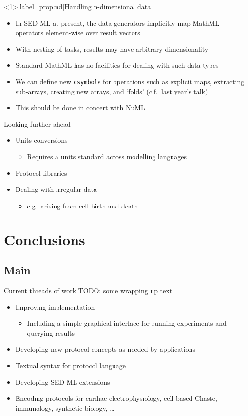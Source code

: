 \documentclass[t,xcolor={usenames,dvipsnames}]{beamer}
\newcommand{\subitem}[1]{\begin{itemize}[<.->]\item #1 \end{itemize}}
\begin{document}
\begin{frame}<1>[label=prop:nd]{Handling n-dimensional data}
\begin{itemize}
\item
  In SED-ML at present, the data generators implicitly map MathML
  operators element-wise over result vectors
\item
  With nesting of tasks, results may have arbitrary dimensionality
\item
  Standard MathML has no facilities for dealing with such data types
\item
  We can define new \texttt{csymbol}s for operations such as explicit
  maps, extracting sub-arrays, creating new arrays, and `folds'
  (c.f.\ last year's talk)
\item
  This should be done in concert with NuML
\end{itemize}
\end{frame}


\begin{frame}{Looking further ahead}
\begin{itemize}[<+->]
\item Units conversions
  \subitem{Requires a units standard across modelling languages}
\item Protocol libraries
\item Dealing with irregular data
  \subitem{e.g.\ arising from cell birth and death}
\end{itemize}
\end{frame}


\section{Conclusions}
\subsection*{Main}

\begin{frame}{Current threads of work}
TODO: some wrapping up text
\begin{itemize}
\item Improving implementation
  \subitem{Including a simple graphical interface for running experiments and querying results}
\item Developing new protocol concepts as needed by applications
\item Textual syntax for protocol language
\item Developing SED-ML extensions
\item Encoding protocols for cardiac electrophysiology, cell-based Chaste, immunology, synthetic biology, \ldots
\end{itemize}
\end{frame}
\end{document}
